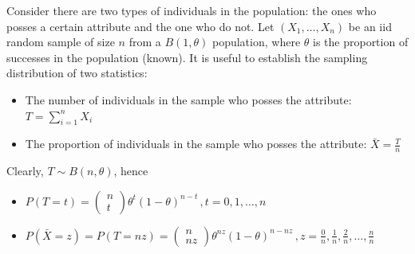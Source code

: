 Consider there are two types of individuals in the population: the ones who posses a certain attribute and the one who do not.
Let $(X_1, \ldots, X_n)$ be an iid random sample of size $n$ from a $B(1,\theta)$ population, where $\theta$ is the proportion of successes in the population (known).
It is useful to establish the sampling distribution of two statistics:
\begin{itemize}
    \item The number of individuals in the sample who posses the attribute: $T = \sum_{i=1}^{n} X_i$
    \item The proportion of individuals in the sample who posses the attribute: $\bar{X} = \frac{T}{n}$
\end{itemize}
Clearly, $T \sim B(n,\theta)$, hence
\begin{itemize}
    \item $P(T=t) = \left(\begin{array}{c} n\\t\end{array}\right)\theta^t(1-\theta)^{n-t}\, ,t=0,1,\ldots,n$
    \item $P(\bar{X} = z) = P\left(T = nz\right) = \left(\begin{array}{c} n\\nz\end{array}\right)\theta^{nz}(1-\theta)^{n-nz}\, ,z = \frac{0}{n}, \frac{1}{n}, \frac{2}{n}, \ldots, \frac{n}{n}$
\end{itemize}
